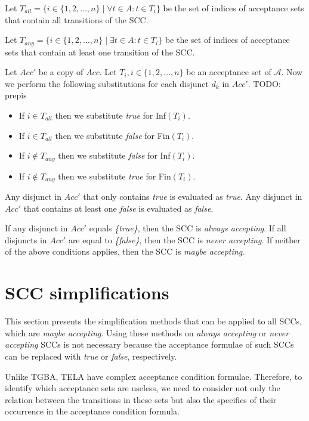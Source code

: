 \documentclass[
  digital, %
  twoside, %
  table,   %
  lof,     %
  lot,     %
]{fithesis3}
\begin{document}
Let $T_{all} = \{i \in \{1, 2, \dots, n\} \mid \forall t \in A \colon t \in T_i \}$ be the set of indices of acceptance sets that contain all transitions of the SCC.

Let $T_{any} = \{i \in \{1, 2, \dots, n\} \mid \exists t \in A \colon t \in T_i \}$ be the set of indices of acceptance sets that contain at least one transition of the SCC.

Let $Acc'$ be a copy of $Acc$. Let $T_i, i \in \{1, 2, \dots, n\}$ be an acceptance set of $\mathcal{A}$. Now we perform the following substitutions for each disjunct $d_k$ in $Acc'$. TODO: prepis
\begin{itemize}
  \item If $i \in T_{all}$ then we substitute \emph{true} for Inf$(T_i)$.
  \item If $i \in T_{all}$ then we substitute \emph{false} for Fin$(T_i)$.
  \item If $i \notin T_{any}$ then we substitute \emph{false} for Inf$(T_i)$.
  \item If $i \notin T_{any}$ then we substitute \emph{true} for Fin$(T_i)$.
\end{itemize}

Any disjunct in $Acc'$ that only contains \emph{true} is evaluated as \emph{true}. Any disjunct in $Acc'$ that contains at least one \emph{false} is evaluated as \emph{false}. 

If any disjunct in $Acc'$ equals \emph{\{true\}}, then the SCC is \emph{always accepting}. If all disjuncts in $Acc'$ are equal to \emph{\{false\}}, then the SCC is \emph{never accepting}. If neither of the above conditions applies, then the SCC is \emph{maybe accepting}.

\section{SCC simplifications}
This section presents the simplification methods that can be applied to all SCCs, which are \emph{maybe accepting}. Using these methods on \emph{always accepting} or \emph{never accepting} SCCs is not necessary because the acceptance formulae of such SCCs can be replaced with \emph{true} or \emph{false}, respectively. 

Unlike TGBA, TELA have complex acceptance condition formulae. Therefore, to identify which acceptance sets are useless, we need to consider not only the relation between the transitions in these sets but also the specifics of their occurrence in the acceptance condition formula. 
\end{document}
